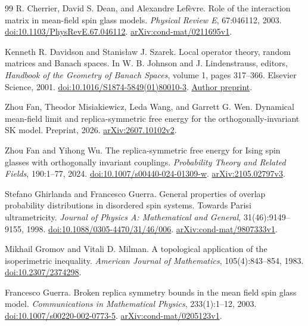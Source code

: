 \begin{thebibliography}{99}
R. Cherrier, David S. Dean, and Alexandre Lef\`evre.
Role of the interaction matrix in mean-field spin glass models.
\emph{Physical Review E}, 67:046112, 2003.
\href{https://doi.org/10.1103/PhysRevE.67.046112}{doi:10.1103/PhysRevE.67.046112}.
\href{https://arxiv.org/abs/cond-mat/0211695v1}{arXiv:cond-mat/0211695v1}.

Kenneth R. Davidson and Stanis\l aw J. Szarek.
Local operator theory, random matrices and Banach spaces.
In W. B. Johnson and J. Lindenstrauss, editors,
\emph{Handbook of the Geometry of Banach Spaces}, volume 1,
pages 317--366. Elsevier Science, 2001.
\href{https://doi.org/10.1016/S1874-5849(01)80010-3}{doi:10.1016/S1874-5849(01)80010-3}.
\href{https://case.edu/artsci/math/szarek/TeX/DavSzaHB.pdf}{Author preprint}.

Zhou Fan, Theodor Misiakiewicz, Leda Wang, and Garrett G. Wen.
Dynamical mean-field limit and replica-symmetric free energy for the
orthogonally-invariant SK model.
Preprint, 2026.
\href{https://arxiv.org/abs/2607.10102v2}{arXiv:2607.10102v2}.

Zhou Fan and Yihong Wu.
The replica-symmetric free energy for Ising spin glasses with
orthogonally invariant couplings.
\emph{Probability Theory and Related Fields}, 190:1--77, 2024.
\href{https://doi.org/10.1007/s00440-024-01309-w}{doi:10.1007/s00440-024-01309-w}.
\href{https://arxiv.org/abs/2105.02797v3}{arXiv:2105.02797v3}.

Stefano Ghirlanda and Francesco Guerra.
General properties of overlap probability distributions in disordered spin systems.
Towards Parisi ultrametricity.
\emph{Journal of Physics A: Mathematical and General}, 31(46):9149--9155, 1998.
\href{https://doi.org/10.1088/0305-4470/31/46/006}{doi:10.1088/0305-4470/31/46/006}.
\href{https://arxiv.org/abs/cond-mat/9807333v1}{arXiv:cond-mat/9807333v1}.

Mikhail Gromov and Vitali D. Milman.
A topological application of the isoperimetric inequality.
\emph{American Journal of Mathematics}, 105(4):843--854, 1983.
\href{https://doi.org/10.2307/2374298}{doi:10.2307/2374298}.

Francesco Guerra.
Broken replica symmetry bounds in the mean field spin glass model.
\emph{Communications in Mathematical Physics}, 233(1):1--12, 2003.
\href{https://doi.org/10.1007/s00220-002-0773-5}{doi:10.1007/s00220-002-0773-5}.
\href{https://arxiv.org/abs/cond-mat/0205123v1}{arXiv:cond-mat/0205123v1}.


\end{thebibliography}

